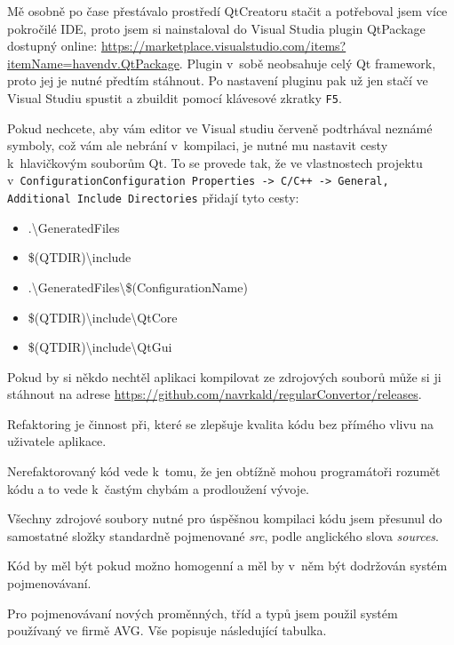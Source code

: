 Mě osobně po čase přestávalo prostředí QtCreatoru stačit a potřeboval jsem více pokročilé IDE, proto jsem si nainstaloval do Visual Studia plugin QtPackage dostupný online: \url{https://marketplace.visualstudio.com/items?itemName=havendv.QtPackage}. Plugin v~sobě neobsahuje celý Qt framework, proto jej je nutné předtím stáhnout. Po nastavení pluginu pak už jen stačí ve Visual Studiu spustit a zbuildit pomocí klávesové zkratky \texttt{F5}.

Pokud nechcete, aby vám editor ve Visual studiu červeně podtrhával neznámé symboly, což vám ale nebrání v~kompilaci, je nutné mu nastavit cesty k~hlavičkovým souborům Qt. To se provede tak, že ve vlastnostech projektu v~\texttt{ConfigurationConfiguration Properties -> C/C++ -> General, Additional Include Directories} přidají tyto cesty: 
\begin{itemize}
	\item .\textbackslash GeneratedFiles
	\item \$(QTDIR)\textbackslash include
	\item .\textbackslash GeneratedFiles\textbackslash\$(ConfigurationName)
	\item \$(QTDIR)\textbackslash include\textbackslash QtCore
	\item \$(QTDIR)\textbackslash include\textbackslash QtGui
\end{itemize}

Pokud by si někdo nechtěl aplikaci kompilovat ze zdrojových souborů může si ji stáhnout na adrese \url{https://github.com/navrkald/regularConvertor/releases}.


Refaktoring je činnost při, které se zlepšuje kvalita kódu bez přímého vlivu na uživatele aplikace.

Nerefaktorovaný kód vede k~tomu, že jen obtížně mohou programátoři rozumět kódu a to vede k~častým chybám a prodloužení vývoje.

Všechny zdrojové soubory nutné pro úspěšnou kompilaci kódu jsem přesunul do samostatné složky standardně pojmenované \textit{src}, podle anglického slova \textit{sources}.

Kód by měl být pokud možno homogenní a měl by v~něm být dodržován systém pojmenovávaní. 


Pro pojmenovávaní nových proměnných, tříd a typů jsem použil systém používaný ve firmě AVG.
Vše popisuje následující tabulka.

